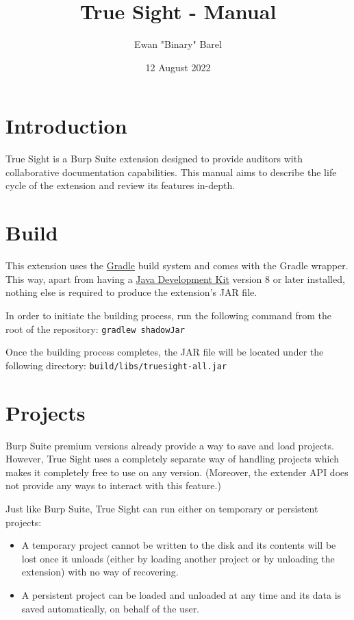\documentclass{article}
\title{True Sight - Manual}
\author{Ewan "Binary" Barel}
\date{12 August 2022}
\begin{document}
\maketitle

\tableofcontents

\newpage

\section{Introduction}

True Sight is a Burp Suite extension designed to provide auditors with collaborative documentation capabilities. This manual aims to describe the life cycle of the extension and review its features in-depth.

\section{Build}

This extension uses the \href{https://gradle.com}{Gradle} build system and comes with the Gradle wrapper. This way, apart from having a \href{https://www.oracle.com/java/technologies/downloads/}{Java Development Kit} version 8 or later installed, nothing else is required to produce the extension's JAR file.

In order to initiate the building process, run the following command from the root of the repository: \verb|gradlew shadowJar|

Once the building process completes, the JAR file will be located under the following directory: \verb|build/libs/truesight-all.jar|

\section{Projects}

Burp Suite premium versions already provide a way to save and load projects. However, True Sight uses a completely separate way of handling projects which makes it completely free to use on any version. (Moreover, the extender API does not provide any ways to interact with this feature.)

Just like Burp Suite, True Sight can run either on temporary or persistent projects:
\begin{itemize}
    \item A temporary project cannot be written to the disk and its contents will be lost once it unloads (either by loading another project or by unloading the extension) with no way of recovering.
    \item A persistent project can be loaded and unloaded at any time and its data is saved automatically, on behalf of the user.
\end{itemize}
\end{document}
